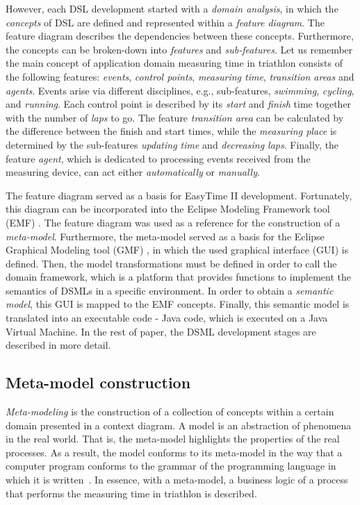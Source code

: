 \documentclass[preprint, prX]{revtex4}
\begin{document}
However, each DSL development started with a \textit{domain analysis}, in which the \textit{concepts} of DSL are defined and represented within a \textit{feature diagram}. The feature diagram describes the dependencies between these concepts. Furthermore, the concepts can be broken-down into \textit{features} and \textit{sub-features}. Let us remember the main concept of application domain measuring time in triathlon consists of the following features: \textit{events}, \textit{control points}, \textit{measuring time}, \textit{transition areas} and \textit{agents}. Events arise via different disciplines, e.g., sub-features, \textit{swimming}, \textit{cycling}, and \textit{running}. Each control point is described by its \textit{start} and \textit{finish} time together with the number of \textit{laps} to go. The feature \textit{transition area} can be calculated by the difference between the finish and start times, while the \textit{measuring place} is determined by the sub-features \textit{updating time} and \textit{decreasing laps}. Finally, the feature \textit{agent}, which is dedicated to processing events received from the measuring device, can act either \textit{automatically} or \textit{manually}. 

The feature diagram served as a basis for EasyTime II development. Fortunately, this diagram can be incorporated into the Eclipse Modeling Framework tool (EMF) \cite{emf}. The feature diagram was used as a reference for the construction of a \textit{meta-model}. Furthermore, the meta-model served as a basis for the Eclipse Graphical Modeling tool (GMF) \cite{EclipseGmf}\cite{gmf}, in which the used graphical interface (GUI) is defined. Then, the model transformations must be defined in order to call the domain framework, which is a platform that provides functions to implement the semantics of DSMLs in a specific environment. In order to obtain a \textit{semantic model}, this GUI is mapped to the EMF concepts. Finally, this semantic model is translated into an executable code - Java code, which is executed on a Java Virtual Machine. In the rest of paper, the DSML development stages are described in more detail.

\subsection{Meta-model construction}

\textit{Meta-modeling} is the construction of a collection of concepts within a certain domain presented in a context diagram. A model is an abstraction of phenomena in the real world. That is, the meta-model highlights the properties of the real processes. As a result, the model conforms to its meta-model in the way that a computer program conforms to the grammar of the programming language in which it is written~\cite{Tolvanen}\cite{monticore}\cite{GrayJ}. In essence, with a meta-model, a business logic of a process that performs the measuring time in triathlon is described. 
\end{document}
